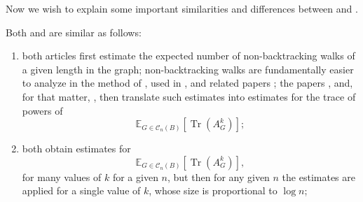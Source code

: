 \documentclass{memo-l}
\theoremstyle{plain}
\theoremstyle{definition}
\numberwithin{section}{chapter}
\numberwithin{equation}{chapter}
\DeclareMathOperator{\Tr}{Tr}
\theoremstyle{plain}
\theoremstyle{definition}
\newcommand\EE{\mathbb{E}}
\newcommand\cC{\mathcal{C}}
\begin{document}
Now we wish to explain some important similarities and differences
between \cite{broder} and \cite{friedman_random_graphs}.



Both \cite{broder} and \cite{friedman_random_graphs} are similar as
follows:
\begin{enumerate}
\item both articles first estimate the expected number of
non-backtracking walks of a given length in the graph;
non-backtracking walks are fundamentally easier to analyze in the method of
\cite{broder}, used in \cite{friedman_random_graphs},
and related
papers \cite{friedman_random_graphs,friedman_relative,friedman_alon}; 
the papers \cite{broder,friedman_random_graphs}, and, for that matter,
\cite{friedman_relative},
then translate such estimates into estimates for
the trace of powers of 
$$
\EE_{G \in \cC_n(B)}[ \Tr(A_G^k) ] ;
$$
\item both obtain estimates for 
$$
\EE_{G \in \cC_n(B)}[ \Tr(A_G^k) ] ,
$$
for many values of $k$ for a given $n$,
but then for any given $n$ the estimates are applied for a single value
of $k$, whose size is proportional to $\log n$;
\end{enumerate}


\end{document}
